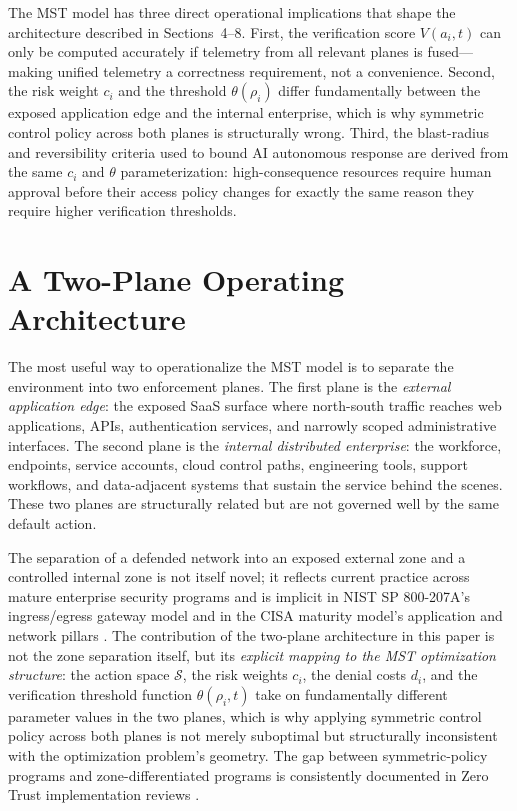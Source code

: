 \documentclass[unnumsec,webpdf,contemporary,large]{oup-authoring-template}
\theoremstyle{thmstyleone}
\theoremstyle{thmstyletwo}
\theoremstyle{thmstylethree}
\begin{document}
The MST model has three direct operational implications that shape the
architecture described in Sections~4--8. First, the verification score
$V(a_i, t)$ can only be computed accurately if telemetry from all relevant
planes is fused---making unified telemetry a correctness requirement, not a
convenience. Second, the risk weight $c_i$ and the threshold $\theta(\rho_i)$
differ fundamentally between the exposed application edge and the internal enterprise,
which is why symmetric control policy across both planes is structurally wrong.
Third, the blast-radius and reversibility criteria used to bound AI autonomous
response are derived from the same $c_i$ and $\theta$ parameterization:
high-consequence resources require human approval before their access policy changes
for exactly the same reason they require higher verification thresholds.

\section{A Two-Plane Operating Architecture}

The most useful way to operationalize the MST model is to separate the environment into two
enforcement planes. The first plane is the \textit{external application edge}: the exposed
SaaS surface where north-south traffic reaches web applications, APIs, authentication
services, and narrowly scoped administrative interfaces. The second plane is the
\textit{internal distributed enterprise}: the workforce, endpoints, service accounts, cloud
control paths, engineering tools, support workflows, and data-adjacent systems that
sustain the service behind the scenes. These two planes are structurally related but are
not governed well by the same default action.

The separation of a defended network into an exposed external zone and a controlled internal
zone is not itself novel; it reflects current practice across mature enterprise security
programs and is implicit in NIST SP 800-207A's ingress/egress gateway model
\cite{chandramouli2023} and in the CISA maturity model's application and network pillars
\cite{cisa2023}. The contribution of the two-plane architecture in this paper is not the
zone separation itself, but its \textit{explicit mapping to the MST optimization
structure}: the action space $\mathcal{S}$, the risk weights $c_i$, the denial costs
$d_i$, and the verification threshold function $\theta(\rho_i, t)$ take on fundamentally
different parameter values in the two planes, which is why applying symmetric control
policy across both planes is not merely suboptimal but structurally inconsistent with
the optimization problem's geometry. The gap between symmetric-policy programs and zone-differentiated programs is
consistently documented in Zero Trust implementation reviews \cite{buck2021}.
\end{document}
